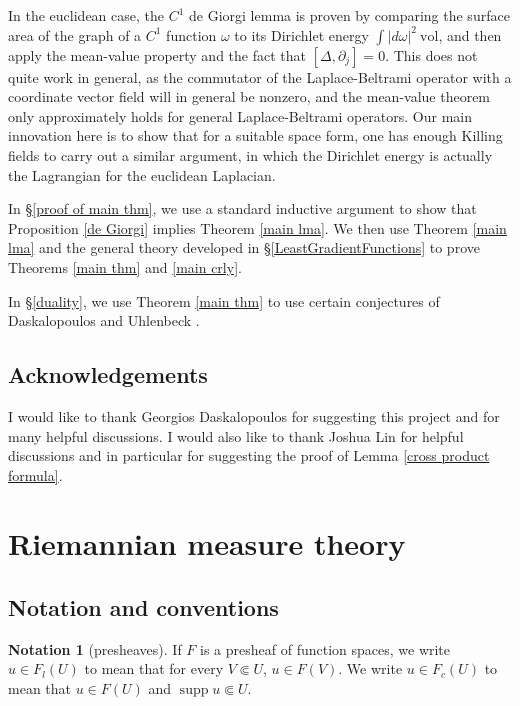 \documentclass[reqno,12pt,letterpaper]{amsart}
\DeclareMathOperator{\supp}{supp}
\newcommand{\vol}{\mathrm{vol}}
\theoremstyle{definition}
\newtheorem{notation}[theorem]{Notation}
\numberwithin{equation}{section}
\begin{document}
In the euclidean case, the $C^1$ de Giorgi lemma is proven by comparing the surface area of the graph of a $C^1$ function $\omega$ to its Dirichlet energy $\int |d\omega|^2~\vol$, and then apply the mean-value property and the fact that $[\Delta, \partial_j] = 0$.
This does not quite work in general, as the commutator of the Laplace-Beltrami operator with a coordinate vector field will in general be nonzero, and the mean-value theorem only approximately holds for general Laplace-Beltrami operators.
Our main innovation here is to show that for a suitable space form, one has enough Killing fields to carry out a similar argument, in which the Dirichlet energy is actually the Lagrangian for the euclidean Laplacian.

In \S\ref{proof of main thm}, we use a standard inductive argument to show that Proposition \ref{de Giorgi} implies Theorem \ref{main lma}.
We then use Theorem \ref{main lma} and the general theory developed in \S\ref{LeastGradientFunctions} to prove Theorems \ref{main thm} and \ref{main crly}.

In \S\ref{duality}, we use Theorem \ref{main thm} to use certain conjectures of Daskalopoulos and Uhlenbeck \cite{daskalopoulos2020transverse}.


\subsection{Acknowledgements}
I would like to thank Georgios Daskalopoulos for suggesting this project and for many helpful discussions.
I would also like to thank Joshua Lin for helpful discussions and in particular for suggesting the proof of Lemma \ref{cross product formula}.


\section{Riemannian measure theory}\label{RiemMeasureThy}
\subsection{Notation and conventions}
\begin{notation}[presheaves]
If $F$ is a presheaf of function spaces, we write $u \in F_l(U)$ to mean that for every $V \Subset U$, $u \in F(V)$.
We write $u \in F_c(U)$ to mean that $u \in F(U)$ and $\supp u \Subset U$.
\end{notation}
\end{document}
